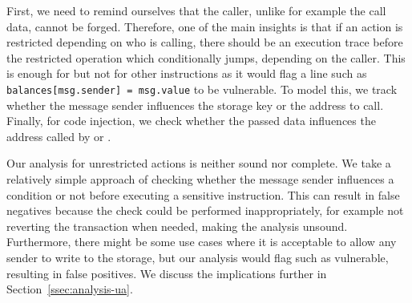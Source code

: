 First, we need to remind ourselves that the caller, unlike for example the call data, cannot be forged.
Therefore, one of the main insights is that if an action is restricted depending on who is calling, there should be an execution trace before the restricted operation which conditionally jumps, depending on the caller.
This is enough for  but not for other instructions as it would flag a line such as \lstinline{balances[msg.sender] = msg.value} to be vulnerable.
To model this, we track whether the message sender influences the storage key or the address to call.
Finally, for code injection, we check whether the passed data influences the address called by  or .

\correctness Our analysis for unrestricted actions is neither sound nor complete.
We take a relatively simple approach of checking whether the message sender influences a condition or not before executing a sensitive instruction.
This can result in false negatives because the check could be performed inappropriately, for example not reverting the transaction when needed, making the analysis unsound.
Furthermore, there might be some use cases where it is acceptable to allow any sender to write to the storage, but our analysis would flag such as vulnerable, resulting in false positives.
We discuss the implications further in Section~\ref{ssec:analysis-ua}.
